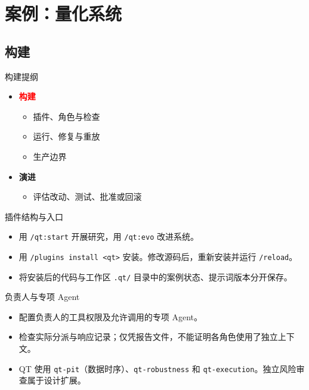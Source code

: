 \section{案例：量化系统}
\subsection{构建}

\begin{frame}{构建提纲}
\begin{itemize}
\item \textcolor{red}{\textbf{构建}}
\begin{itemize}
\item 插件、角色与检查
\item 运行、修复与重放
\item 生产边界
\end{itemize}
\item \textcolor{black!55}{\textbf{演进}}
\begin{itemize}
\item \textcolor{black!55}{评估改动、测试、批准或回滚}
\end{itemize}
\end{itemize}
\end{frame}

\begin{frame}{插件结构与入口}
\begin{center}

\end{center}
\begin{itemize}
\item 用 \texttt{/qt:start} 开展研究，用 \texttt{/qt:evo} 改进系统。
\item 用 \texttt{/plugins install <qt>} 安装。修改源码后，重新安装并运行 \texttt{/reload}。
\item 将安装后的代码与工作区 \texttt{.qt/} 目录中的案例状态、提示词版本分开保存。
\end{itemize}
\end{frame}

\begin{frame}{负责人与专项 Agent}
\begin{center}

\end{center}
\begin{itemize}
\item 配置负责人的工具权限及允许调用的专项 Agent。
\item 检查实际分派与响应记录；仅凭报告文件，不能证明各角色使用了独立上下文。
\item QT 使用 \texttt{qt-pit}（数据时序）、\texttt{qt-robustness} 和 \texttt{qt-execution}。独立风险审查属于设计扩展。
\end{itemize}
\end{frame}


